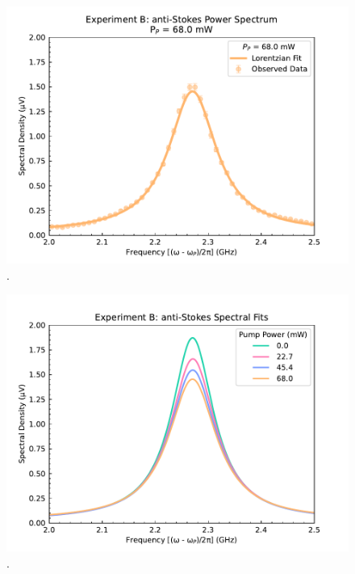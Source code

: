 \begin{figure}[t!]
  \centering
  \includegraphics[width=\textwidth]{figs/3-Cooling/P-P anti-Stokes Fit - 165mW.pdf}
  \caption{.}
  \label{fig:Cooling:P-P anti-Stokes Fit - 165mW}
\end{figure}

\begin{figure}[t!]
  \centering
  \includegraphics[width=\textwidth]{figs/3-Cooling/P-P anti-Stokes Fits.pdf}
  \caption{.}
  \label{fig:Cooling:P-P anti-Stokes Fits}
\end{figure}

